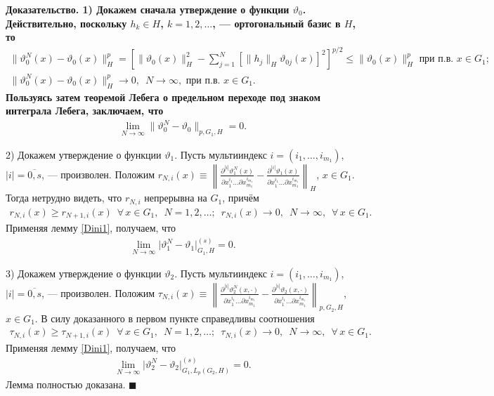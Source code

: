 \documentclass{report}
\newenvironment{Proof}{\par\noindent\bf Доказательство.\rm}{ $\blacksquare$\par}
\begin{document}
\begin{Proof}
1) Докажем сначала утверждение о функции $\vartheta_0$. Действительно, поскольку  $h_k\in H$, $k=1,2,\dots$, --- ортогональный базис в $H$, то
\begin{gather*}
\|\vartheta_0^N(x)-\vartheta_0(x)\|_H^p= \left[\|\vartheta_0(x)\|_H^2-\sum\limits_{j=1}^N[\|h_j\|_H\vartheta_{0j}(x)]^2\right]^{p/2}
\leqslant\|\vartheta_0(x)\|_H^p\mbox{ при п.в. $x\in G_1$;}\\
\|\vartheta_0^N(x)-\vartheta_0(x)\|_H^p\to0,\,\,\,N\to\infty,\mbox{ при п.в. $x\in G_1$.}
\end{gather*}
Пользуясь затем теоремой Лебега о предельном переходе под знаком интеграла Лебега, заключаем, что
\begin{gather*}
\lim\limits_{N\to\infty}\|\vartheta_0^N-\vartheta_0\|_{p,G_1,H}=0.
\end{gather*}

2) Докажем утверждение о функции $\vartheta_1$. Пусть мультииндекс $i=(i_1,\dots,i_{m_1})$, $|i|=\overline{0,s}$, --- произволен. Положим $r_{N,i}(x)\equiv \left\|\frac{\partial^{|i|}
\vartheta_1^N(x)}{\partial x_1^{i_1}\dots\partial x_{m_1}^{i_{m_1}}}-\frac{\partial^{|i|}\vartheta_1(x)}{\partial x_1^{i_1}\dots\partial x_{m_1}^{i_{m_1}}}\right\|_H$, $x\in G_1$. Тогда
нетрудно видеть, что $r_{N,i}$ непрерывна на $G_1$, причём
\begin{gather*}
r_{N,i}(x)\geqslant r_{N+1,i}(x)\,\,\,\forall\,x\in G_1,\,\,\,N=1,2,\dots;\,\,\, r_{N,i}(x)\to0,\,\,\,N\to\infty,\,\,\,\forall\,x\in G_1.
\end{gather*}
Применяя лемму \ref{Dini1}, получаем, что
\begin{gather*}
\lim\limits_{N\to\infty}\pmb{|}\vartheta_1^N-\vartheta_1\pmb{|}^{(s)}_{G_1,H}=0.
\end{gather*}

3) Докажем утверждение о функции $\vartheta_2$. Пусть мультииндекс $i=(i_1,\dots,i_{m_1})$, $|i|=\overline{0,s}$, --- произволен. Положим
$\tau_{N,i}(x)\equiv \left\|\frac{\partial^{|i|}\vartheta_2^N(x,\cdot)}{\partial x_1^{i_1}\dots\partial x_{m_1}^{i_{m_1}}}-
\frac{\partial^{|i|}\vartheta_2(x,\cdot)}{\partial x_1^{i_1}\dots\partial x_{m_1}^{i_{m_1}}} \right\|_{p,G_2,H}$, $x\in G_1$. В силу доказанного в первом пункте справедливы соотношения
\begin{gather*}
\tau_{N,i}(x)\geqslant \tau_{N+1,i}(x)\,\,\,\forall\,x\in G_1,\,\,\,N=1,2,\dots;\,\,\, \tau_{N,i}(x)\to0,\,\,\,N\to\infty,\,\,\,
\forall\,x\in G_1.
\end{gather*}
Применяя лемму \ref{Dini1}, получаем, что
\begin{gather*}
\lim\limits_{N\to\infty}\pmb{|}\vartheta_2^N-\vartheta_2\pmb{|}^{(s)}_{G_1,L_p(G_2,H)}=0.
\end{gather*}
Лемма полностью доказана.
\end{Proof}
\end{document}
